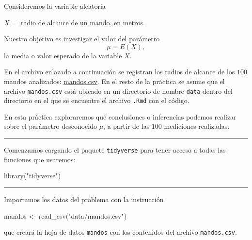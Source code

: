 \documentclass[
  degree=mecinf,
  title=normal,
  toc=normal,
  bib=normal]{mnye}
\newenvironment{Shaded}{\begin{snugshade}}{\end{snugshade}}
\newcommand{\FunctionTok}[1]{\textcolor[rgb]{0.00,0.00,0.00}{#1}}
\newcommand{\NormalTok}[1]{#1}
\newcommand{\OtherTok}[1]{\textcolor[rgb]{0.56,0.35,0.01}{#1}}
\newcommand{\StringTok}[1]{\textcolor[rgb]{0.31,0.60,0.02}{#1}}
\begin{document}
Consideremos la variable aleatoria

\begin{center}
\(X =\) radio de alcance de un mando, en metros.

\end{center}

Nuestro objetivo es investigar el valor del parámetro
\[
\mu = E(X),
\]
la media o valor esperado de la variable \(X\).

En el archivo enlazado a continuación se registran los radios de alcance de los \(100\) mandos analizados: \href{https://drive.google.com//uc?export=download\&id=1RGAPpTJJnTpj9R4jpZ5TO3u1t1RUgkJK}{mandos.csv}. En el resto de la práctica se asume que el archivo \texttt{mandos.csv} está ubicado en un directorio de nombre \texttt{data} dentro del directorio en el que se encuentre el archivo \texttt{.Rmd} con el código.

En esta práctica exploraremos qué conclusiones o inferencias podemos realizar sobre el parámetro desconocido \(\mu\), a partir de las \(100\) mediciones realizadas.

\begin{center}\rule{0.5\linewidth}{0.5pt}\end{center}

Comenzamos cargando el paquete \texttt{tidyverse} para tener acceso a todas las funciones que usaremos:

\begin{Shaded}
\begin{Highlighting}[]
\FunctionTok{library}\NormalTok{(}\StringTok{"tidyverse"}\NormalTok{)}
\end{Highlighting}
\end{Shaded}

\begin{center}\rule{0.5\linewidth}{0.5pt}\end{center}

Importamos los datos del problema con la instrucción

\begin{Shaded}
\begin{Highlighting}[]
\NormalTok{mandos }\OtherTok{\textless{}{-}} \FunctionTok{read\_csv}\NormalTok{(}\StringTok{"data/mandos.csv"}\NormalTok{)}
\end{Highlighting}
\end{Shaded}

que creará la hoja de datos \texttt{mandos} con los contenidos del archivo \texttt{mandos.csv}.
\end{document}
